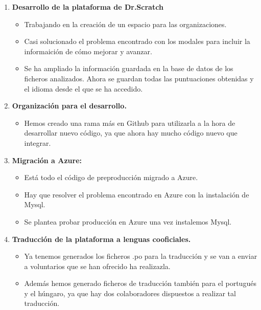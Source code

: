 \documentclass[a4paper,12pt]{letter}
\begin{document}
\begin{letter}
\begin{enumerate}
    
    \item{\textbf {Desarrollo de la plataforma de Dr.Scratch}}
    \begin{itemize}
            \item {Trabajando en la creación de un espacio para las organizaciones.}
            \item {Casi solucionado el problema encontrado con los modales para 
                    incluir la informaición de cómo mejorar y avanzar.}
            \item {Se ha ampliado la información guardada en la base de datos
                    de los ficheros analizados. Ahora se guardan todas las puntuaciones
                    obtenidas y el idioma desde el que se ha accedido.}
    \end{itemize}
    
    \item{\textbf {Organización para el desarrollo.}}
    \begin{itemize}
            \item {Hemos creado una rama más en Github para utilizarla a la hora
                    de desarrollar nuevo código, ya que ahora hay mucho código 
                    nuevo que integrar.}
    \end{itemize}

    \item{\textbf {Migración a Azure:}}
    \begin{itemize}
        \item {Está todo el código de preproducción migrado a Azure.}
        \item {Hay que resolver el problema encontrado en Azure con la instalación de Mysql.}
        \item {Se plantea probar producción en Azure una vez instalemos Mysql.}
    \end{itemize}

	\item{\textbf {Traducción de la plataforma a lenguas cooficiales.}}
    \begin{itemize}
        \item {Ya tenemos generados los ficheros .po para la  traducción y se van
                a enviar a voluntarios que se han ofrecido ha realizazla.}
           \item {Además hemos generado ficheros de traducción también para el
                portugués y el húngaro, ya que hay dos colaboradores 
                dispuestos a realizar tal traducción.}
    \end{itemize}

\end{enumerate}

\end{letter}
\end{document}
